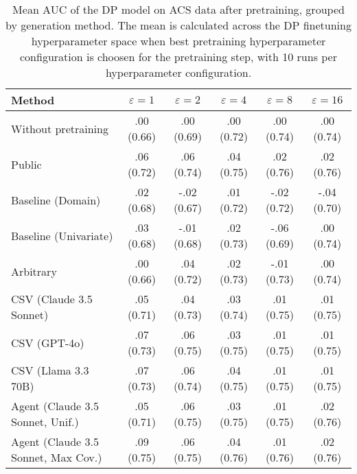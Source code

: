 \begin{table}[h!]
    \centering
    \caption{Mean AUC of the DP model on ACS data after pretraining, grouped by generation method. The mean is calculated across the DP finetuning hyperparameter space when best pretraining hyperparameter configuration is choosen for the pretraining step, with 10 runs per hyperparameter configuration.}
    \label{tab:epsilon_comparison}
    \begin{tabular}{lccccc}
    \toprule
    Method & $\varepsilon=1$ & $\varepsilon=2$ & $\varepsilon=4$ & $\varepsilon=8$ & $\varepsilon=16$ \\
    \midrule
    Without pretraining & .00 {\small (0.66)} & .00 {\small (0.69)} & .00 {\small (0.72)} & .00 {\small (0.74)} & .00 {\small (0.74)} \\
    \arrayrulecolor{black!50!}\midrule
    Public & .06 {\small (0.72)} & .06 {\small (0.74)} & \cellcolor{silver!30}.04 {\small (0.75)} & \cellcolor{silver!30}.02 {\small (0.76)} & \cellcolor{silver!30}.02 {\small (0.76)} \\
    \arrayrulecolor{black!50!}\midrule
    Baseline (Domain) & .02 {\small (0.68)} & -.02 {\small (0.67)} & .01 {\small (0.72)} & -.02 {\small (0.72)} & -.04 {\small (0.70)} \\
    Baseline (Univariate) & .03 {\small (0.68)} & -.01 {\small (0.68)} & .02 {\small (0.73)} & -.06 {\small (0.69)} & .00 {\small (0.74)} \\
    \arrayrulecolor{black!50!}\midrule
    Arbitrary & .00 {\small (0.66)} & .04 {\small (0.72)} & .02 {\small (0.73)} & -.01 {\small (0.73)} & .00 {\small (0.74)} \\
    \arrayrulecolor{black!50!}\midrule
    CSV (Claude 3.5 Sonnet) & .05 {\small (0.71)} & .04 {\small (0.73)} & .03 {\small (0.74)} & .01 {\small (0.75)} & .01 {\small (0.75)} \\
    CSV (GPT-4o) & \cellcolor{bronze!30}.07 {\small (0.73)} & .06 {\small (0.75)} & .03 {\small (0.75)} & .01 {\small (0.75)} & .01 {\small (0.75)} \\
    CSV (Llama 3.3 70B) & .07 {\small (0.73)} & .06 {\small (0.74)} & .04 {\small (0.75)} & .01 {\small (0.75)} & .01 {\small (0.75)} \\
    \arrayrulecolor{black!50!}\midrule
    Agent (Claude 3.5 Sonnet, Unif.) & .05 {\small (0.71)} & \cellcolor{bronze!30}.06 {\small (0.75)} & .03 {\small (0.75)} & .01 {\small (0.75)} & \cellcolor{bronze!30}.02 {\small (0.76)} \\
    Agent (Claude 3.5 Sonnet, Max Cov.) & \cellcolor{gold!30}.09 {\small (0.75)} & \cellcolor{gold!30}.06 {\small (0.75)} & \cellcolor{gold!30}.04 {\small (0.76)} & \cellcolor{bronze!30}.01 {\small (0.76)} & \cellcolor{gold!30}.02 {\small (0.76)} \\

\end{tabular}
\end{table}
